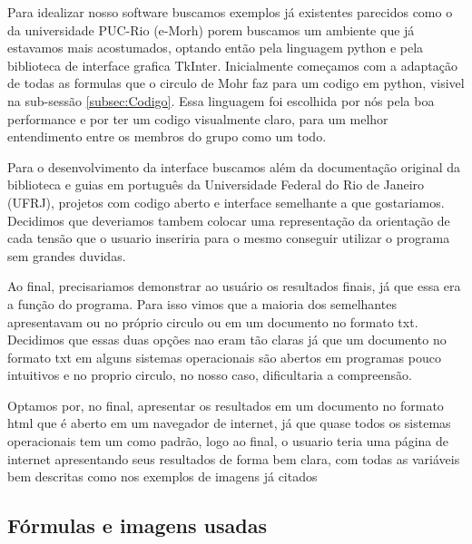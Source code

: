 \documentclass[a4paper]{article}
\begin{document}
Para idealizar nosso software buscamos exemplos já  existentes parecidos como o da universidade PUC-Rio (e-Morh) porem buscamos um ambiente que já estavamos mais acostumados, optando então pela linguagem python e pela biblioteca de interface grafica TkInter. 
Inicialmente começamos com a adaptação de todas as formulas que o circulo de Mohr faz para um codigo em python, visivel na sub-sessão \ref{subsec:Codigo}. Essa linguagem foi escolhida por nós pela boa performance e por ter um codigo visualmente claro, para um melhor entendimento entre os membros do grupo como um todo.

Para o desenvolvimento da interface buscamos além da documentação original da biblioteca e guias em português da Universidade Federal do Rio de Janeiro (UFRJ), projetos com codigo aberto e interface semelhante a que gostariamos. Decidimos que deveriamos tambem colocar uma representação da orientação de cada tensão que o usuario inseriria para o mesmo conseguir utilizar o programa sem grandes duvidas.

Ao final, precisariamos demonstrar ao usuário os resultados finais, já que essa era a função do programa. Para isso vimos que a maioria dos semelhantes apresentavam ou no próprio circulo ou em um documento no formato txt. Decidimos que essas duas opções nao eram tão claras já que um documento no formato txt em alguns sistemas operacionais são abertos em programas pouco intuitivos e no proprio circulo, no nosso caso, dificultaria a compreensão. 

Optamos por, no final, apresentar os resultados em um documento no formato html que é aberto em um navegador de internet, já que quase todos os sistemas operacionais tem um como padrão, logo ao final, o usuario teria uma página de internet apresentando seus resultados de forma bem clara, com todas as variáveis bem descritas como nos exemplos de imagens já citados



\label{subsec: Fórmulas}

	\subsection{Fórmulas e imagens usadas}
\end{document}
